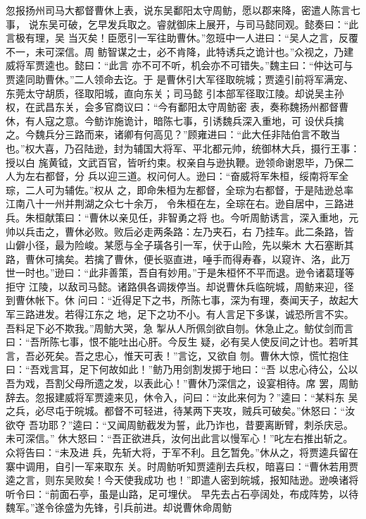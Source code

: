 忽报扬州司马大都督曹休上表，说东吴鄱阳太守周鲂，愿以郡来降，密遣人陈言七事，
说东吴可破，乞早发兵取之。睿就御床上展开，与司马懿同观。懿奏曰：“此言极有理，吴
当灭矣！臣愿引一军往助曹休。”忽班中一人进曰：“吴人之言，反覆不一，未可深信。周
鲂智谋之士，必不肯降，此特诱兵之诡计也。”众视之，乃建威将军贾逵也。懿曰：“此言
亦不可不听，机会亦不可错失。”魏主曰：“仲达可与贾逵同助曹休。”二人领命去讫。于
是曹休引大军径取皖城；贾逵引前将军满宠、东莞太守胡质，径取阳城，直向东关；司马懿
引本部军径取江陵。却说吴主孙权，在武昌东关，会多官商议曰：“今有鄱阳太守周鲂密
表，奏称魏扬州都督曹休，有人寇之意。今鲂诈施诡计，暗陈七事，引诱魏兵深入重地，可
设伏兵擒之。今魏兵分三路而来，诸卿有何高见？”顾雍进曰：“此大任非陆伯言不敢当
也。”权大喜，乃召陆逊，封为辅国大将军、平北都元帅，统御林大兵，摄行王事：授以白
旄黄钺，文武百官，皆听约束。权亲自与逊执鞭。逊领命谢恩毕，乃保二人为左右都督，分
兵以迎三道。权问何人。逊曰：“奋威将军朱桓，绥南将军全琮，二人可为辅佐。”权从
之，即命朱桓为左都督，全琮为右都督，于是陆逊总率江南八十一州并荆湖之众七十余万，
令朱桓在左，全琮在右。逊自居中，三路进兵。朱桓献策曰：“曹休以亲见任，非智勇之将
也。今听周鲂诱言，深入重地，元帅以兵击之，曹休必败。败后必走两条路：左乃夹石，右
乃挂车。此二条路，皆山僻小径，最为险峻。某愿与全子璜各引一军，伏于山险，先以柴木
大石塞断其路，曹休可擒矣。若擒了曹休，便长驱直进，唾手而得寿春，以窥许、洛，此万
世一时也。”逊曰：“此非善策，吾自有妙用。”于是朱桓怀不平而退。逊令诸葛瑾等拒守
江陵，以敌司马懿。诸路俱各调拨停当。却说曹休兵临皖城，周鲂来迎，径到曹休帐下。休
问曰：“近得足下之书，所陈七事，深为有理，奏闻天子，故起大军三路进发。若得江东之
地，足下之功不小。有人言足下多谋，诚恐所言不实。吾料足下必不欺我。”周鲂大哭，急
掣从人所佩剑欲自刎。休急止之。鲂仗剑而言曰：“吾所陈七事，恨不能吐出心肝。今反生
疑，必有吴人使反间之计也。若听其言，吾必死矣。吾之忠心，惟天可表！”言讫，又欲自
刎。曹休大惊，慌忙抱住曰：“吾戏言耳，足下何故如此！”鲂乃用剑割发掷于地曰：“吾
以忠心待公，公以吾为戏，吾割父母所遗之发，以表此心！”曹休乃深信之，设宴相待。席
罢，周鲂辞去。忽报建威将军贾逵来见，休令入，问曰：“汝此来何为？”逵曰：“某料东
吴之兵，必尽屯于皖城。都督不可轻进，待某两下夹攻，贼兵可破矣。”休怒曰：“汝欲夺
吾功耶？”逵曰：“又闻周鲂截发为誓，此乃诈也，昔要离断臂，刺杀庆忌。未可深信。”
休大怒曰：“吾正欲进兵，汝何出此言以慢军心！”叱左右推出斩之。众将告曰：“未及进
兵，先斩大将，于军不利。且乞暂免。”休从之，将贾逵兵留在寨中调用，自引一军来取东
关。时周鲂听知贾逵削去兵权，暗喜曰：“曹休若用贾逵之言，则东吴败矣！今天使我成功
也！”即遣人密到皖城，报知陆逊。逊唤诸将听令曰：“前面石亭，虽是山路，足可埋伏。
早先去占石亭阔处，布成阵势，以待魏军。”遂令徐盛为先锋，引兵前进。却说曹休命周鲂
